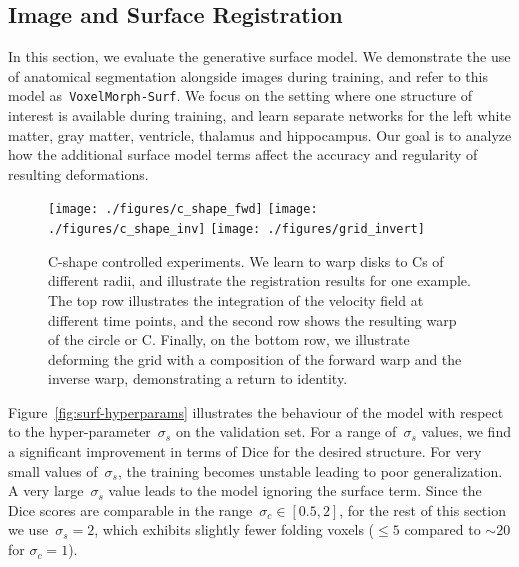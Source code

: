 \documentclass{article}
\begin{document}
\subsection{Image and Surface Registration}


	
	In this section, we evaluate the generative surface model. We demonstrate the use of anatomical segmentation alongside images during training, and refer to this model as~\verb|VoxelMorph-Surf|. We focus on the setting where one structure of interest is available during training, and learn separate networks for the left white matter, gray matter, ventricle, thalamus and hippocampus. Our goal is to analyze how the additional surface model terms affect the accuracy and regularity of resulting deformations.
	






\begin{figure*}[t!]
	\centering
	\texttt{[image: ./figures/c\_shape\_fwd]}
	\vspace{0.3cm}
	\texttt{[image: ./figures/c\_shape\_inv]}
	\texttt{[image: ./figures/grid\_invert]}
	\hfill
	\caption{\color{blue} C-shape controlled experiments. We learn to warp disks to Cs of different radii, and illustrate the registration results for one example. The top row illustrates the integration of the velocity field at different time points, and the second row shows the resulting warp of the circle or C. Finally, on the bottom row, we illustrate deforming the grid with a composition of the forward warp and the inverse warp, demonstrating a return to identity.}
	\label{fig:C_shape}
\end{figure*}





	
	Figure~\ref{fig:surf-hyperparams} illustrates the behaviour of the model with respect to the hyper-parameter~$\sigma_s$ on the validation set. For a range of~$\sigma_s$ values, we find a significant improvement in terms of Dice for the desired structure. For very small values of~$\sigma_s$, the training becomes unstable leading to poor generalization. A very large~$\sigma_s$ value leads to the model ignoring the surface term. Since the Dice scores are comparable in the range~$\sigma_c \in [0.5, 2]$, for the rest of this section we use~$\sigma_s = 2$, which exhibits slightly fewer folding voxels ($\le5$ compared to $\sim20$ for $\sigma_c=1$).
	
\end{document}
